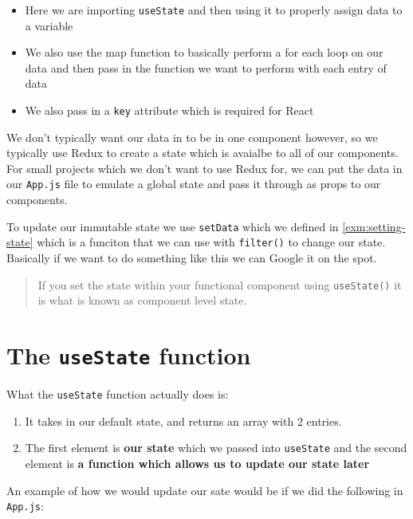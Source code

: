 \documentclass[
]{report}
\providecommand{\tightlist}{%
  \setlength{\itemsep}{0pt}\setlength{\parskip}{0pt}}
\begin{document}
\begin{itemize}
\tightlist
\item
  Here we are importing \texttt{useState} and then using it to properly assign data to a variable
\item
  We also use the map function to basically perform a for each loop on our data and then pass in the function we want to perform with each entry of data
\item
  We also pass in a \texttt{key} attribute which is required for React
\end{itemize}

We don't typically want our data in to be in one component however, so we typically use Redux to create a state which is avaialbe to all of our components. For small projects which we don't want to use Redux for, we can put the data in our \texttt{App.js} file to emulate a global state and pass it through as props to our components.

To update our immutable state we use \texttt{setData} which we defined in \ref{exm:setting-state} which is a funciton that we can use with \texttt{filter()} to change our state. Basically if we want to do something like this we can Google it on the spot.

\begin{quote}
If you set the state within your functional component using \texttt{useState()} it is what is known as component level state.
\end{quote}

\hypertarget{the-usestate-function}{%
\section{\texorpdfstring{The \texttt{useState} function}{The useState function}}\label{the-usestate-function}}

What the \texttt{useState} function actually does is:

\begin{enumerate}
\def\labelenumi{\arabic{enumi}.}
\tightlist
\item
  It takes in our default state, and returns an array with 2 entries.
\item
  The first element is \textbf{our state} which we passed into \texttt{useState} and the
  second element is \textbf{a function which allows us to update our state later}
\end{enumerate}

An example of how we would update our sate would be if we did the following in
\texttt{App.js}:
\end{document}
